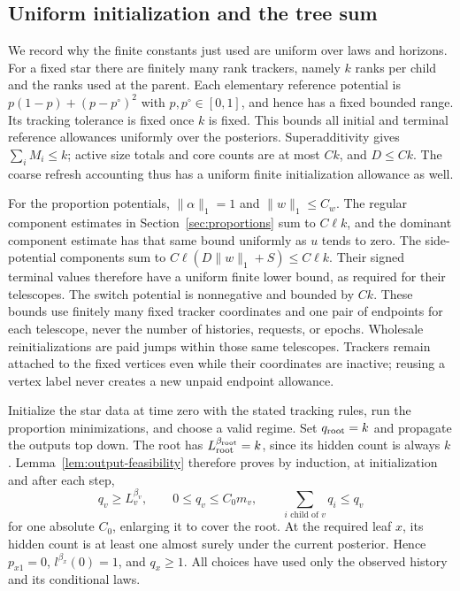 \subsection{Uniform initialization and the tree sum}

We record why the finite constants just used are uniform over laws
and horizons.  For a fixed star there are finitely many rank trackers,
namely \(k\) ranks per child and the ranks used at the parent.
Each elementary reference potential is
\(p(1-p)+(p-p^\circ)^2\) with \(p,p^\circ\in[0,1]\), and hence
has a fixed bounded range.  Its tracking tolerance is fixed once
\(k\) is fixed.  This bounds all initial and terminal reference
allowances uniformly over the posteriors.  Superadditivity gives
\(\sum_i M_i\le k\); active size totals and core counts are at most
\(Ck\), and \(D\le Ck\).  The coarse refresh accounting thus has
a uniform finite initialization allowance as well.

For the proportion potentials, \(\|\alpha\|_1=1\) and
\(\|w\|_1\le C_w\).  The regular component estimates in
Section~\ref{sec:proportions} sum to \(C\ell k\), and the dominant
component estimate has that same bound uniformly as \(u\) tends
to zero.  The side-potential components sum to
\(C\ell(D\|w\|_1+S)\le C\ell k\).  Their signed terminal
values therefore have a uniform finite lower bound, as required
for their telescopes.  The switch potential is nonnegative and
bounded by \(Ck\).  These bounds use finitely many fixed tracker
coordinates and one pair of endpoints for each telescope, never
the number of histories, requests, or epochs.  Wholesale
reinitializations are paid jumps within those same telescopes.
Trackers remain attached to the fixed vertices even while their
coordinates are inactive; reusing a vertex label never creates a
new unpaid endpoint allowance.

Initialize the star data at time zero with the stated tracking
rules, run the proportion minimizations, and choose a valid regime.
Set \(q_{\rm root}=k\) and propagate the outputs top down.  The root
has \(L_{\rm root}^{\beta_{\rm root}}=k\), since its hidden count
is always \(k\).  Lemma~\ref{lem:output-feasibility} therefore
proves by induction, at initialization and after each step,
\[
 q_v\ge L_v^{\beta_v},\qquad
 0\le q_v\le C_0m_v,\qquad
 \sum_{i\text{ child of }v}q_i\le q_v
\]
for one absolute \(C_0\), enlarging it to cover the root.  At the
required leaf \(x\), its hidden count is at least one almost surely
under the current posterior.  Hence \(p_{x1}=0\),
\(l^{\beta_x}(0)=1\), and \(q_x\ge1\).  All choices have used
only the observed history and its conditional laws.

